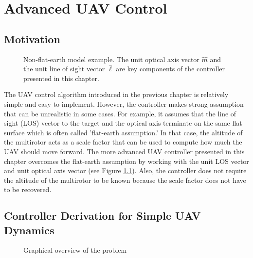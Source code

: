 \chapter{Advanced UAV Control}
\section{Motivation}
\begin{figure}[htbp]
	\centering
	\caption{Non-flat-earth model example. The unit optical axis vector $\hat{m}$ and the unit line of sight vector $\hat{\ell}$ are key components of the controller presented in this chapter.}
	\label{nonflatearth}
\end{figure}
The UAV control algorithm introduced in the previous chapter is relatively simple and easy to implement. However, the controller makes strong assumption that can be unrealistic in some cases. For example, it assumes that the line of sight (LOS) vector to the target and the optical axis terminate on the same flat surface which is often called 'flat-earth assumption.' In that case, the altitude of the multirotor acts as a scale factor that can be used to compute how much the UAV should move forward. The more advanced UAV controller presented in this chapter overcomes the flat-earth assumption by working with the unit LOS vector and unit optical axis vector (see Figure \ref{nonflatearth}). Also, the controller does not require the altitude of the multirotor to be known because the scale factor does not have to be recovered.

\section{Controller Derivation for Simple UAV Dynamics}
\begin{figure}[htbp]
	\centering
	\caption{Graphical overview of the problem}
	\label{overview}
\end{figure}

